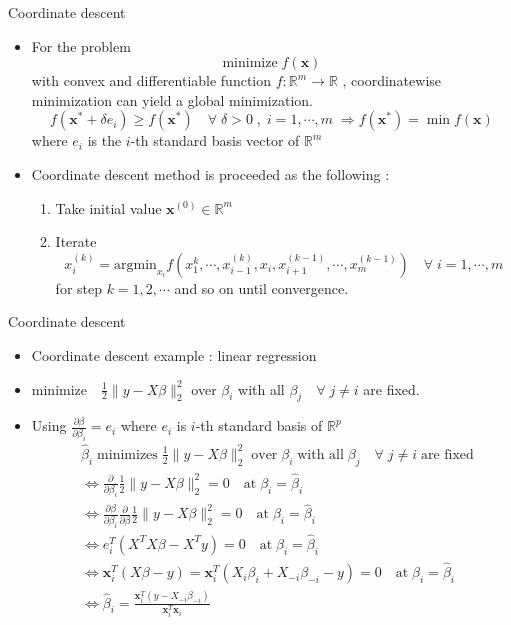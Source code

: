 \documentclass[11pt]{beamer}
\newcommand{\R}{\mathbb{R}}
\begin{document}
\begin{frame}{Coordinate descent}
    \begin{itemize}
        \item For the problem $$\text{minimize} \;f(\mathbf{x})$$ with convex and differentiable function $f:\R^m\rightarrow \R$ , coordinatewise minimization can yield a global minimization. $$f(\mathbf{x}^*+\delta e_i)\geq f(\mathbf{x}^*) \quad \forall\; \delta>0\; ,\; i=1, \cdots ,m \; \Rightarrow f(\mathbf{x}^*)=\min f(\mathbf{x})$$ where $e_i$ is the $i$-th standard basis vector of $\R^m$
        \item Coordinate descent method is proceeded as the following : 
        \begin{enumerate}
            \item Take initial value $\mathbf{x}^{(0)}\in \R^m$
            \item Iterate $$x_i^{(k)}=\text{argmin}_{x_i} f(x_1^{k}, \cdots, x_{i-1}^{(k)}, x_i, x_{i+1}^{(k-1)},\cdots,  x_m^{(k-1)})\quad \forall\; i=1, \cdots, m$$ for step $k=1, 2, \cdots $ and so on until convergence.
        \end{enumerate}
    \end{itemize}
\end{frame}

\begin{frame}{Coordinate descent}
    \begin{itemize}
        \item Coordinate descent example : linear regression
        \item $\text{minimize}\quad \frac 12 \|y-X\beta\|_2^2$ over $\beta_i$ with all $\beta_j\quad\forall \;j\neq i$ are fixed.
        \item Using $\frac{\partial \beta}{\partial \beta_i} = e_i$ where $e_i$ is $i$-th standard basis of $\R^p$
        \begin{align*}
            &\hat \beta_i \;\text{minimizes}\; \frac 12 \|y-X\beta\|_2^2 \;\text{over}\; \beta_i \;\text{with all}\; \beta_j\quad\forall \;j\neq i \;\text{are fixed} \\
            &\Leftrightarrow \frac{\partial}{\partial \beta_i}\frac 12 \|y-X\beta\|_2^2=0 \quad \text{at}\; \beta_i=\hat\beta_i \\
            &\Leftrightarrow \frac{\partial\beta}{\partial \beta_i} \frac{\partial}{\partial \beta}\frac 12 \|y-X\beta\|_2^2=0 \quad \text{at}\; \beta_i=\hat\beta_i \\
            &\Leftrightarrow e_i^T(X^TX\beta-X^Ty)=0 \quad \text{at}\; \beta_i=\hat\beta_i \\
            &\Leftrightarrow \mathbf{x}_i^T(X\beta-y)=\mathbf{x}_i^T (X_i\beta_i + X_{-i}\beta_{-i} -y)=0 \quad \text{at}\; \beta_i=\hat\beta_i \\
            &\Leftrightarrow \hat\beta_i=\frac{\mathbf{x}_i^T(y-X_{-i}\beta_{-i})}{\mathbf{x}_i^T\mathbf{x}_i}
        \end{align*}
    \end{itemize}
\end{frame}
\end{document}
